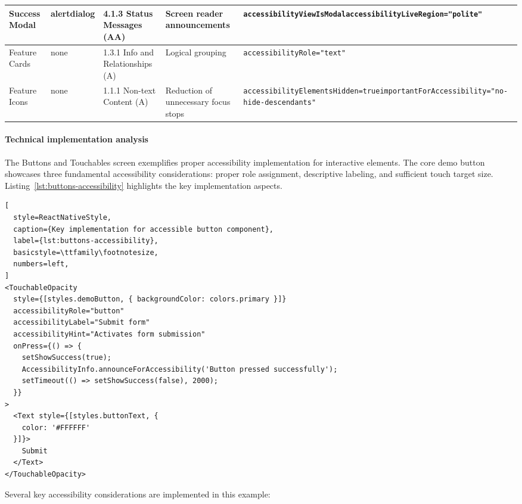\begin{longtable}{|p{2.5cm}|p{2cm}|p{2.8cm}|p{2.8cm}|p{5cm}|}
\hline
Success Modal & alertdialog & 4.1.3 Status Messages (AA) & Screen reader announcements & \texttt{accessibilityViewIsModal}\newline \texttt{accessibilityLiveRegion="polite"} \\
\hline
Feature Cards & none & 1.3.1 Info and Relationships (A) & Logical grouping & \texttt{accessibilityRole="text"} \\
\hline
Feature Icons & none & 1.1.1 Non-text Content (A) & Reduction of unnecessary focus stops & \texttt{accessibilityElementsHidden=true}\newline \texttt{importantForAccessibility="no-hide-descendants"} \\
\end{longtable}

\paragraph{Technical implementation analysis}

The Buttons and Touchables screen exemplifies proper accessibility implementation for interactive elements. The core demo button showcases three fundamental accessibility considerations: proper role assignment, descriptive labeling, and sufficient touch target size. Listing~\ref{lst:buttons-accessibility} highlights the key implementation aspects.

\begin{lstlisting}[
  style=ReactNativeStyle,
  caption={Key implementation for accessible button component},
  label={lst:buttons-accessibility},
  basicstyle=\ttfamily\footnotesize,
  numbers=left,
]
<TouchableOpacity
  style={[styles.demoButton, { backgroundColor: colors.primary }]}
  accessibilityRole="button"
  accessibilityLabel="Submit form"
  accessibilityHint="Activates form submission"
  onPress={() => {
    setShowSuccess(true);
    AccessibilityInfo.announceForAccessibility('Button pressed successfully');
    setTimeout(() => setShowSuccess(false), 2000);
  }}
>
  <Text style={[styles.buttonText, {
    color: '#FFFFFF'
  }]}>
    Submit
  </Text>
</TouchableOpacity>
\end{lstlisting}

Several key accessibility considerations are implemented in this example:

